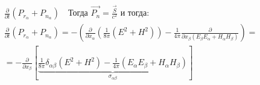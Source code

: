 \begin{gather*}
    \frac{\partial}{\partial  t}(P_{r_{\alpha} }+P_{n_{\alpha} }  ) \quad \text{Тогда } \vec{P_n}=\frac{\vec{S}}{c^2}  \text{ и тогда:} \\
    \frac{\partial}{\partial  t}(P_{r_{\alpha} }+P_{n_{\alpha} }  )=-\left(\frac{\partial}{\partial x_{\alpha}}\left( \frac{1}{8\pi}(E^2+H^2)  \right) -\frac{1}{4\pi} \frac{\partial}{\partial  x_{\beta} (E_{\beta}E_{\alpha}+H_{\alpha}H_{\beta}    ) }      \right)= \\
    =-\frac{\partial}{\partial x_{\beta} } \left[ \underbrace{\frac{1}{8\pi}\delta_{\alpha\beta}(E^2+H^2)-\frac{1}{4\pi}(E_{\alpha}E_{\beta}+H_{\alpha}H_{\beta}  )   }_{\sigma_{\alpha\beta}} \right] 
\end{gather*}